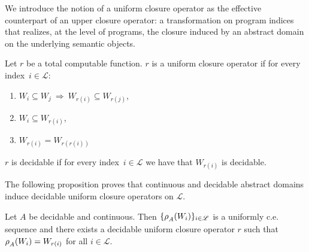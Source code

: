 \documentclass[runningheads]{llncs}
\def\ok#1{\mbox{\raisebox{0ex}[1ex][1ex]{$#1$}}}
\def\re{c.e.}
\newcommand{\ccL}{\mathscr{L}}
\newcommand{\Domain}{\mathbb{D}}
\newcommand{\auco}[2]{\ok{\rho^{#1}_{#2}}}
\def\ok#1{\mbox{\raisebox{0ex}[1ex][1ex]{$#1$}}}
\def\cAA{\ensuremath{A}}
\begin{document}
We introduce the notion of a uniform closure operator as the effective counterpart of an upper closure operator: a transformation on program indices that realizes, at the level of programs, the closure induced by an abstract domain on the underlying semantic objects.

\begin{definition}
Let $r$ be a total computable function. $r$ is a uniform closure operator if for every index~$i\in\ccL$:
\begin{enumerate}
  \item $W_i \subseteq W_j ~\Rightarrow~W_{r(i)}\subseteq W_{r(j)}$,
  \item $W_i \subseteq W_{r(i)}$,
  \item $W_{r(i)}= W_{r(r(i))}$
\end{enumerate}
$r$ is decidable if for every index~$i\in\ccL$ we have that $W_{r(i)}$ is decidable.
\end{definition}

The following proposition proves that continuous and decidable abstract domains induce decidable uniform closure operators on $\ccL$.

\begin{proposition}
    Let $\cAA$ be decidable and continuous. Then $\{\auco{}{\cAA}(W_i)\}_{i\in\ccL}$ is a uniformly {\re} sequence and there exists a decidable uniform closure operator
    $r$ such that $\auco{}{\cAA}(W_i)=W_{r(i)}$ for all $i\in\ccL$.
\end{proposition}
\end{document}

